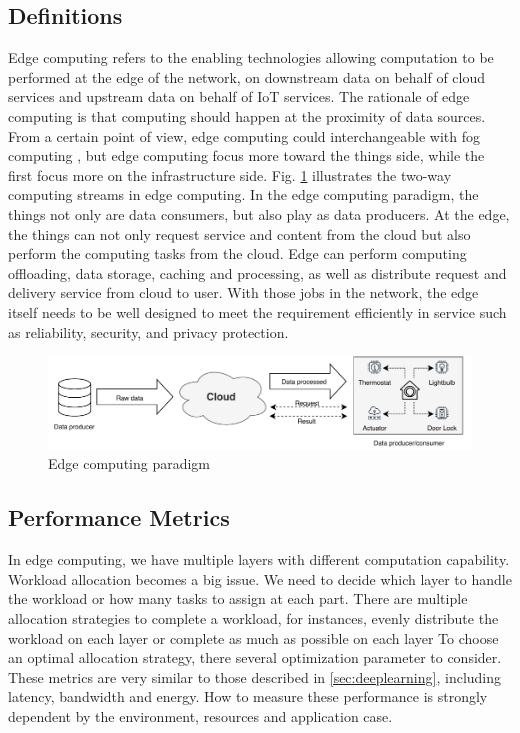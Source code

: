 \subsection{Definitions}
Edge computing refers to the enabling technologies allowing computation to be performed at the edge of the network, on downstream data on behalf of cloud services and upstream data on behalf of IoT services. The rationale of edge computing is that computing should happen at the proximity of data sources. From a certain point of view, edge computing could interchangeable with fog computing \cite{openfog}, but edge computing focus more toward the things side, while the first focus more on the infrastructure side. Fig. \ref{fig:edgearch} illustrates the two-way computing streams in edge computing. In the edge computing paradigm, the things not only are data consumers, but also play as data producers. At the edge, the things can not only request service and content from the cloud but also perform the computing tasks from the cloud. Edge can perform computing offloading, data storage, caching and processing, as well as distribute request and delivery service from cloud to user. With those jobs in the network, the edge itself needs to be well designed to meet the requirement efficiently in service such as reliability, security, and privacy protection.

\begin{figure}
	\includegraphics[width=0.9\linewidth]{images/edgearch}
	\caption{Edge computing paradigm}
	\label{fig:edgearch}
\end{figure}


\subsection{Performance Metrics}
In edge computing, we have multiple layers with different computation capability. Workload allocation becomes a big
issue. We need to decide which layer to handle the workload or how many tasks to assign at each part. There are multiple allocation strategies to complete a workload, for instances,
evenly distribute the workload on each layer or complete as much as possible on each layer To choose an optimal allocation strategy, there several optimization parameter to consider. These metrics are very similar to those described in \ref{sec:deeplearning}, including latency, bandwidth and energy. How to measure these performance is strongly dependent by the environment, resources and application case.


